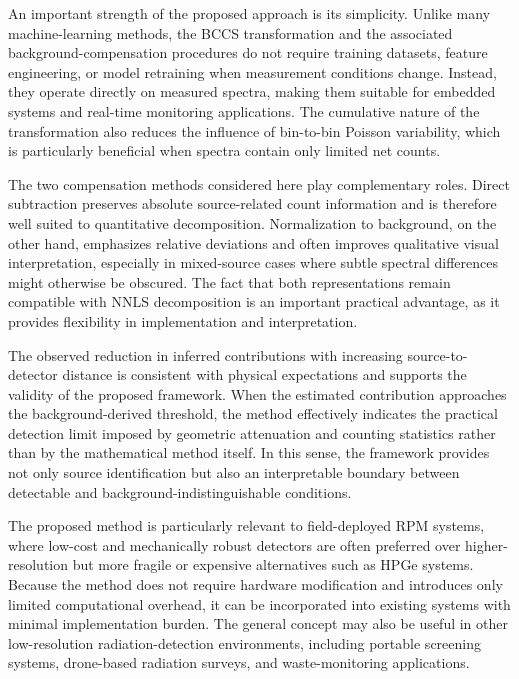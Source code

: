 \documentclass[fleqn, 10pt]{wlscirep}
\begin{document}
An important strength of the proposed approach is its simplicity. Unlike many machine-learning methods, the BCCS transformation and the associated background-compensation procedures do not require training datasets, feature engineering, or model retraining when measurement conditions change. Instead, they operate directly on measured spectra, making them suitable for embedded systems and real-time monitoring applications. The cumulative nature of the transformation also reduces the influence of bin-to-bin Poisson variability, which is particularly beneficial when spectra contain only limited net counts. 

The two compensation methods considered here play complementary roles. Direct subtraction preserves absolute source-related count information and is therefore well suited to quantitative decomposition. Normalization to background, on the other hand, emphasizes relative deviations and often improves qualitative visual interpretation, especially in mixed-source cases where subtle spectral differences might otherwise be obscured. The fact that both representations remain compatible with NNLS decomposition is an important practical advantage, as it provides flexibility in implementation and interpretation.

The observed reduction in inferred contributions with increasing source-to-detector distance is consistent with physical expectations and supports the validity of the proposed framework. When the estimated contribution approaches the background-derived threshold, the method effectively indicates the practical detection limit imposed by geometric attenuation and counting statistics rather than by the mathematical method itself. In this sense, the framework provides not only source identification but also an interpretable boundary between detectable and background-indistinguishable conditions.

The proposed method is particularly relevant to field-deployed RPM systems, where low-cost and mechanically robust detectors are often preferred over higher-resolution but more fragile or expensive alternatives such as HPGe systems. Because the method does not require hardware modification and introduces only limited computational overhead, it can be incorporated into existing systems with minimal implementation burden. The general concept may also be useful in other low-resolution radiation-detection environments, including portable screening systems, drone-based radiation surveys, and waste-monitoring applications.
\end{document}
